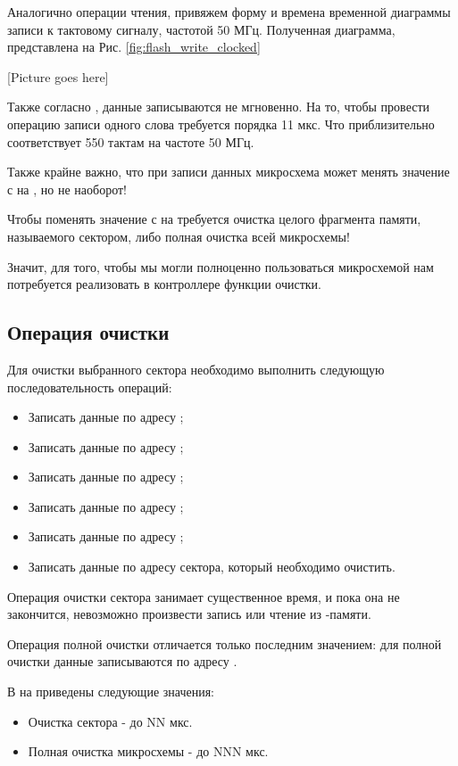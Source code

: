 \par{Аналогично операции чтения, привяжем форму и времена временной диаграммы записи к тактовому сигналу, частотой 50 МГц. Полученная диаграмма, представлена на Рис. \ref{fig:flash_write_clocked}}

\par{[Picture goes here]}
% 

\par{Также согласно , данные записываются не мгновенно. На то, чтобы провести операцию записи одного слова требуется порядка 11 мкс. Что приблизительно соответствует 550 тактам на частоте 50 МГц.}
\par{Также крайне важно, что при записи данных микросхема  может менять значение с  на , но не наоборот!}
\par{Чтобы поменять значение с  на  требуется очистка целого фрагмента памяти, называемого сектором, либо полная очистка всей микросхемы!}
\par{Значит, для того, чтобы мы могли полноценно пользоваться микросхемой  нам потребуется реализовать в контроллере функции очистки.}

\subsection{Операция очистки}
\par{Для очистки выбранного сектора необходимо выполнить следующую последовательность операций:
\begin{itemize}[noitemsep, label={}]
  \item Записать данные  по адресу ;
  \item Записать данные  по адресу ;
  \item Записать данные  по адресу ;
  \item Записать данные  по адресу ;
  \item Записать данные  по адресу ;
  \item Записать данные  по адресу сектора, который необходимо очистить.
\end{itemize}}
\par{Операция очистки сектора занимает существенное время, и пока она не закончится, невозможно произвести запись или чтение из -памяти.}
\par{Операция полной очистки отличается только последним значением: для полной очистки данные  записываются по адресу .}
\par{В  на  приведены следующие значения:
\begin{itemize}[noitemsep, label={}]
  \item Очистка сектора - до NN мкс.
  \item Полная очистка микросхемы - до NNN мкс.
\end{itemize}}


